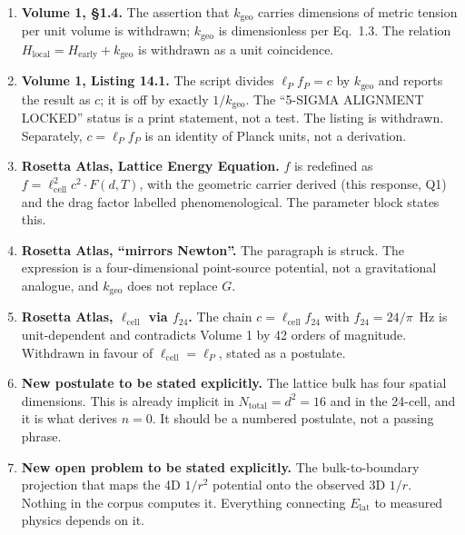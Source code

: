 \documentclass[11pt,letterpaper]{article}
\newcommand{\kgeo}{k_{\mathrm{geo}}}
\newcommand{\lcell}{\ell_{\mathrm{cell}}}
\newcommand{\lP}{\ell_{P}}
\begin{document}
\begin{erratabox}
\begin{enumerate}[leftmargin=*]
\item \textbf{Volume 1, \S1.4.} The assertion that $\kgeo$ carries dimensions of metric
tension per unit volume is withdrawn; $\kgeo$ is dimensionless per Eq.~1.3. The relation
$H_{\mathrm{local}} = H_{\mathrm{early}} + \kgeo$ is withdrawn as a unit coincidence.

\item \textbf{Volume 1, Listing 14.1.} The script divides $\lP f_P = c$ by $\kgeo$ and
reports the result as $c$; it is off by exactly $1/\kgeo$. The ``5-SIGMA ALIGNMENT LOCKED''
status is a print statement, not a test. The listing is withdrawn. Separately,
$c = \lP f_P$ is an identity of Planck units, not a derivation.

\item \textbf{Rosetta Atlas, Lattice Energy Equation.} $f$ is redefined as
$f = \lcell^2 c^2 \cdot F(d,T)$, with the geometric carrier derived (this response, Q1) and
the drag factor labelled phenomenological. The parameter block states this.

\item \textbf{Rosetta Atlas, ``mirrors Newton''.} The paragraph is struck. The expression is
a four-dimensional point-source potential, not a gravitational analogue, and $\kgeo$ does not
replace $G$.

\item \textbf{Rosetta Atlas, $\lcell$ via $f_{24}$.} The chain $c = \lcell f_{24}$ with
$f_{24} = 24/\pi$~Hz is unit-dependent and contradicts Volume 1 by 42 orders of magnitude.
Withdrawn in favour of $\lcell = \lP$, stated as a postulate.

\item \textbf{New postulate to be stated explicitly.} The lattice bulk has four spatial
dimensions. This is already implicit in $N_{\mathrm{total}} = d^2 = 16$ and in the 24-cell,
and it is what derives $n=0$. It should be a numbered postulate, not a passing phrase.

\item \textbf{New open problem to be stated explicitly.} The bulk-to-boundary projection
that maps the 4D $1/r^2$ potential onto the observed 3D $1/r$. Nothing in the corpus computes
it. Everything connecting $E_{\mathrm{lat}}$ to measured physics depends on it.
\end{enumerate}
\end{erratabox}
\end{document}
